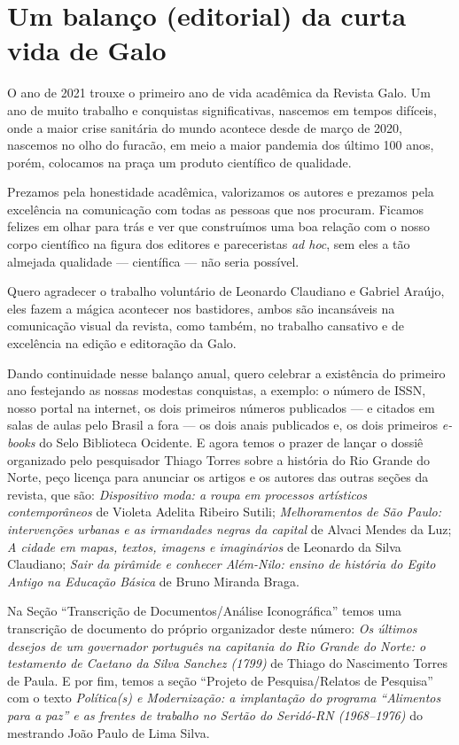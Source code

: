 \chapter{Um balanço (editorial) da curta vida de Galo}

O ano de 2021 trouxe o primeiro ano de vida acadêmica da Revista Galo. Um ano de muito trabalho e conquistas significativas, nascemos em tempos difíceis, onde a maior crise sanitária do mundo acontece desde de março de 2020, nascemos no olho do furacão, em meio a maior pandemia dos último 100 anos, porém, colocamos na praça um produto científico de qualidade. 

Prezamos pela honestidade acadêmica, valorizamos os autores e prezamos pela excelência na comunicação com todas as pessoas que nos procuram. Ficamos felizes em olhar para trás e ver que construímos uma boa relação com o nosso corpo científico na figura dos editores e pareceristas \textit{ad hoc}, sem eles a tão almejada qualidade --- científica --- não seria possível.  

Quero agradecer o trabalho voluntário de Leonardo Claudiano e Gabriel Araújo, eles fazem a mágica acontecer nos bastidores, ambos são incansáveis na comunicação visual da revista, como também, no trabalho cansativo e de excelência na edição e editoração da Galo. 

Dando continuidade nesse balanço anual, quero celebrar a existência do primeiro ano festejando as nossas modestas conquistas, a exemplo: o número de ISSN, nosso portal na internet, os dois primeiros números publicados --- e citados em salas de aulas pelo Brasil a fora --- os dois anais publicados e, os dois primeiros \textit{e-books} do Selo Biblioteca Ocidente. E agora temos o prazer de lançar o dossiê organizado pelo pesquisador Thiago Torres sobre a história do Rio Grande do Norte, peço licença para anunciar os artigos e os autores das outras seções da revista, que são: \textit{Dispositivo moda: a roupa em processos artísticos contemporâneos} de Violeta Adelita Ribeiro Sutili; \textit{Melhoramentos de São Paulo: intervenções urbanas e as irmandades negras da capital} de Alvaci Mendes da Luz; \textit{A cidade em mapas, textos, imagens e imaginários} de Leonardo da Silva Claudiano; \textit{Sair da pirâmide e conhecer Além-Nilo: ensino de história do Egito Antigo na Educação Básica} de Bruno Miranda Braga. 

Na Seção “Transcrição de Documentos/Análise Iconográfica” temos uma transcrição de documento do próprio organizador deste número: \textit{Os últimos desejos de um governador português na capitania do Rio Grande do Norte: o testamento de Caetano da Silva Sanchez (1799)} de Thiago do Nascimento Torres de Paula. E por fim, temos a seção “Projeto de Pesquisa/Relatos de Pesquisa” com o texto \textit{Política(s) e Modernização: a implantação do programa “Alimentos para a paz” e as frentes de trabalho no Sertão do Seridó-RN (1968--1976)} do mestrando João Paulo de Lima Silva. 

